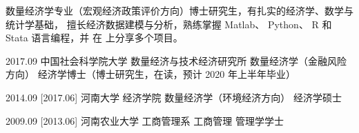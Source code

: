 \documentclass[zh]{resume}
\begin{document}
\makeheader

{\onehalfspacing\hspace{2em}
数量经济学专业（宏观经济政策评价方向）博士研究生，有扎实的经济学、数学与统计学基础，
擅长经济数据建模与分析，熟练掌握  Matlab、 Python、 R 和 Stata 语言编程，并
在  上分享多个项目。
\par} 

\begin{competences}
\end{competences}

\begin{educations}
  \education%
    {2017.09}%
    {中国社会科学院大学}%
    {数量经济与技术经济研究所}%
    {数量经济学（金融风险方向）}%
    {经济学博士（博士研究生，在读，预计 2020 年上半年毕业）}

  \separator{0.5em}
  \education%
    {2014.09}%
    [2017.06]%
    {河南大学}%
    {经济学院}%
    {数量经济学（环境经济方向）}%
    {经济学硕士}

  \separator{0.5em}
  \education%
    {2009.09}%
    [2013.06]%
    {河南农业大学}%
    {工商管理系}%
    {工商管理}%
    {管理学学士}
\end{educations}
\end{document}
